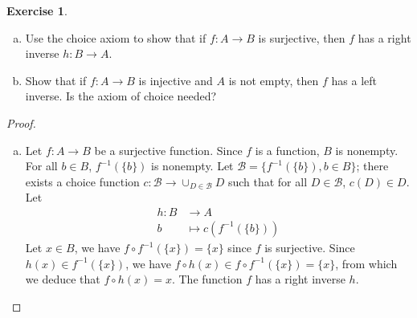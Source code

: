 \documentclass[11pt,a4paper,twoside]{article}
\theoremstyle{definition}
\newcounter{excounter}
\newtheorem{exercise}[excounter]{Exercise}
\begin{document}
\begin{exercise}

  \begin{enumerate}[(a)]

  \item Use the choice axiom to show that if $f : A \to B$ is surjective, then $f$ has a right inverse $h : B \to A$.
  \item Show that if $f : A \to B$ is injective and $A$ is not empty, then $f$ has a left inverse. Is the axiom of choice needed?

  \end{enumerate}

\end{exercise}

\begin{proof}\hfill

  \begin{enumerate}[(a)]

  \item Let $f : A \to B$ be a surjective function. Since $f$ is a function, $B$ is nonempty.
    For all $b \in B$, $f^{-1} ( \{ b \} )$ is nonempty. Let $\mathscr{B} = \big\{ f^{-1} ( \{ b \} ), b \in B \big\}$; there exists a choice function
    $c : \mathscr{B} \to \cup_{D \in \mathscr{B}} D$ such that for all $D \in \mathscr{B}$, $c (D) \in D$. Let
    \begin{align*}
      h : B &\to A \\
      b &\mapsto c \left( f^{-1} \left( \{ b \} \right)\right)
    \end{align*}
    Let $x \in B$, we have $f \circ f^{-1} ( \{ x \} ) = \{ x \}$ since $f$ is surjective.
    Since $h ( x ) \in f^{-1} ( \{ x \} )$, we have $f \circ h ( x ) \in f \circ f^{-1} ( \{ x \} ) = \{ x \}$, from which we deduce that
    $f \circ h (x) = x$. The function $f$ has a right inverse $h$.


\end{enumerate}
\end{proof}
\end{document}
